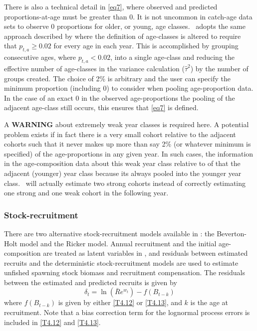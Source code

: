 There is also a technical detail in \eqref{eq7}, where observed and predicted proportions-at-age must be greater than 0.  It is not uncommon in catch-age data sets to observe 0 proportions for older, or young, age classes.  \iscam\ adopts the same approach described by \cite{richards1997visualizing} where the definition of age-classes is altered to require that $p_{t,a}\geq 0.02$ for every age in each year.  This is accomplished by grouping consecutive ages, where $p_{t,a} <0.02$, into a single age-class and reducing the effective number of age-classes in the variance calculation ($\widehat{\tau}^2$) by the number of groups created.  The choice of 2\% is arbitrary and the user can specify the minimum proportion (including 0) to consider when pooling age-proportion data.  In the case of an exact 0 in the observed age-proportions the pooling of the adjacent age-class still occurs, this ensures that \eqref{eq7} is defined.


A \textbf{WARNING} about extremely weak year classes is required here.  A potential problem exists if in fact there is a very small cohort relative to the adjacent cohorts such that it never makes up more than say 2\% (or whatever minimum is specified) of the age-proportions in any given year.  In such cases, the information in the age-composition data about this weak year class relative to of that the adjacent (younger) year class because its always pooled into the younger year class.  \iscam\ will actually estimate two strong cohorts instead of correctly estimating one strong and one weak cohort in the following year.

\subsubsection{Stock-recruitment}
There are two alternative stock-recruitment models available in \iscam: the Beverton-Holt model and the Ricker model.  Annual recruitment and the initial age-composition are treated as latent variables in \iscam, and residuals between estimated recruits and the deterministic stock-recruitment models are used to estimate unfished spawning stock biomass and recruitment compensation.  The residuals between the estimated and predicted recruits is given by
\begin{equation}\label{eq9}
    \delta_t = \ln(\bar{R}e^{w_t}) - f(B_{t-k})
\end{equation}
where $f(B_{t-k})$ is given by either \eqref{T4.12} or \eqref{T4.13}, and $k$ is the age at recruitment.  Note that a bias correction term for the lognormal process  errors is included in  \eqref{T4.12} and \eqref{T4.13}.

